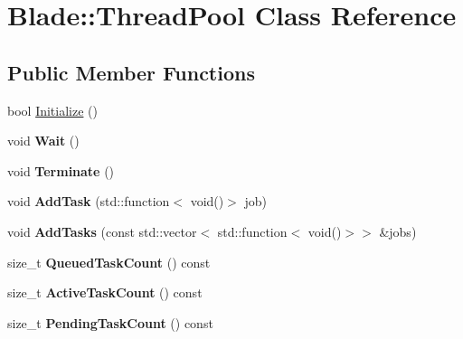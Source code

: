 \hypertarget{class_blade_1_1_thread_pool}{}\section{Blade\+:\+:Thread\+Pool Class Reference}
\label{class_blade_1_1_thread_pool}
\subsection*{Public Member Functions}
\begin{DoxyCompactItemize}
\item 
bool \hyperlink{class_blade_1_1_thread_pool_a47f7b1929e59c4be260f1616a7340ca7}{Initialize} ()
\item 
\mbox{\label{class_blade_1_1_thread_pool_af4d1c27beaf4747690dae01a00f9037b}} 
void {\bfseries Wait} ()
\item 
\mbox{\label{class_blade_1_1_thread_pool_a5ed5801d197bac182a28e2d430007db0}} 
void {\bfseries Terminate} ()
\item 
\mbox{\label{class_blade_1_1_thread_pool_acc1d6c39383a95582641b5b34d44040c}} 
void {\bfseries Add\+Task} (std\+::function$<$ void()$>$ job)
\item 
\mbox{\label{class_blade_1_1_thread_pool_acacbc26ec4bf163a12b5005c3d1fd0c5}} 
void {\bfseries Add\+Tasks} (const std\+::vector$<$ std\+::function$<$ void()$>$$>$ \&jobs)
\item 
\mbox{\label{class_blade_1_1_thread_pool_a30124532ff2e5e72c1d03ae9f6029b91}} 
size\+\_\+t {\bfseries Queued\+Task\+Count} () const
\item 
\mbox{\label{class_blade_1_1_thread_pool_a0f046b3e1be7b85ef0a21f94c2380aa8}} 
size\+\_\+t {\bfseries Active\+Task\+Count} () const
\item 
\mbox{\label{class_blade_1_1_thread_pool_af24597a7aa14bc296735f9f2d7d460df}} 
size\+\_\+t {\bfseries Pending\+Task\+Count} () const
\end{DoxyCompactItemize}


